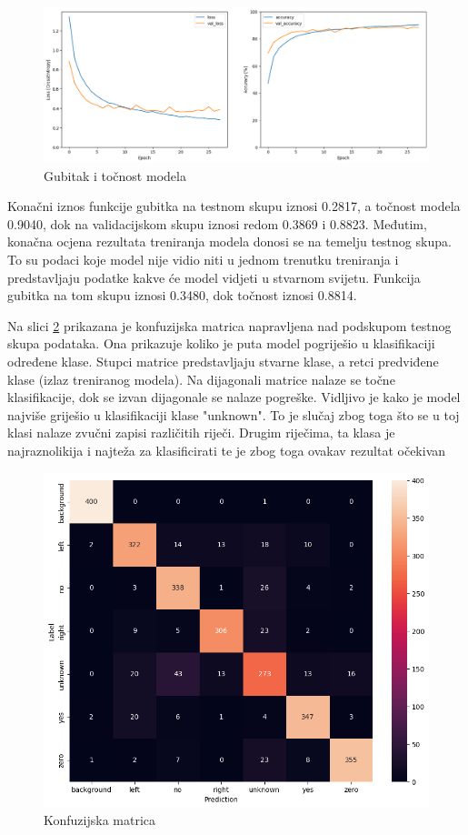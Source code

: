 \begin{figure}[htb]
    \centering
    \includegraphics[width=1\linewidth]{Chapters/neuronska_mreza/trening/acc.png} 
    \caption{Gubitak i točnost modela}
    \label{pic:accuracy}
\end{figure}

Konačni iznos funkcije gubitka na testnom skupu iznosi 0.2817, a točnost modela 0.9040, dok
na validacijskom skupu iznosi redom 0.3869 i 0.8823. Međutim, konačna ocjena rezultata
treniranja modela donosi se na temelju testnog skupa. To su podaci koje model nije vidio
niti u jednom trenutku treniranja i predstavljaju podatke kakve će model vidjeti u stvarnom
svijetu. Funkcija gubitka na tom skupu iznosi 0.3480, dok točnost iznosi 0.8814.

Na slici \ref{pic:confmtrx} prikazana je konfuzijska matrica napravljena nad podskupom
testnog skupa podataka. Ona prikazuje koliko je puta model pogriješio u klasifikaciji
određene klase. Stupci matrice predstavljaju stvarne klase, a retci predviđene klase
(izlaz treniranog modela). Na dijagonali matrice nalaze se točne klasifikacije, dok
se izvan dijagonale se nalaze pogreške. Vidljivo je kako je model najviše griješio
u klasifikaciji klase "unknown". To je slučaj zbog toga što se u toj klasi nalaze
zvučni zapisi različitih riječi. Drugim riječima, ta klasa je najraznolikija i najteža
za klasificirati te je zbog toga ovakav rezultat očekivan

\begin{figure}[htb]
    \centering
    \includegraphics[width=0.7\linewidth]{Chapters/neuronska_mreza/trening/conf.png} 
    \caption{Konfuzijska matrica}
    \label{pic:confmtrx}
\end{figure}

